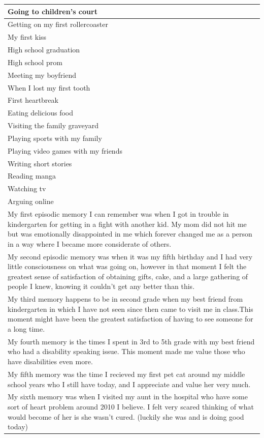 \documentclass[
  .7em,
  letterpaper,
  DIV=11,
  numbers=noendperiod]{scrartcl}
\begin{document}
\begin{table}
\begin{tabular}{l}
\hline
Going to children's court\\
\hline
Getting on my first rollercoaster\\
\hline
My first kiss\\
\hline
High school graduation\\
\hline
High school prom\\
\hline
Meeting my boyfriend\\
\hline
When I lost my first tooth\\
\hline
First heartbreak\\
\hline
Eating delicious food\\
\hline
Visiting the family graveyard\\
\hline
Playing sports with my family\\
\hline
Playing video games with my friends\\
\hline
Writing short stories\\
\hline
Reading manga\\
\hline
Watching tv\\
\hline
Arguing online\\
\hline
My first episodic memory I can remember was when I got in trouble in kindergarten for getting in a fight with another kid. My mom did not hit me but was emotionally disappointed in me which forever changed me as a person in a way where I became more considerate of others.\\
\hline
My second episodic memory was when it was my fifth birthday and I had very little consciousness on what was going on, however in that moment I felt the greatest sense of satisfaction of obtaining gifts, cake, and a large gathering of people I knew, knowing it couldn't get any better than this.\\
\hline
My third memory happens to be in second grade when my best friend from kindergarten in which I have not seen since then came to visit me in class.This moment might have been the greatest satisfaction of having to see someone for a long time.\\
\hline
My fourth memory is the times I spent in 3rd to 5th grade with my best friend who had a disability speaking issue. This moment made me value those who have disabilities even more.\\
\hline
My fifth memory was the time I recieved my first pet cat around my middle school years who I still have today, and I appreciate and value her very much.\\
\hline
My sixth memory was when I visited my aunt in the hospital who have some sort of heart problem around 2010 I believe. I felt very scared thinking of what would become of her is she wasn't cured. (luckily she was and is doing good today)\\

\end{tabular}
\end{table}
\end{document}
